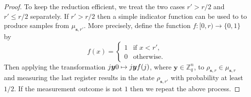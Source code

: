 \documentclass[11pt]{article}
\theoremstyle{plain}
\theoremstyle{definition}
\let\ket\relax
\DeclarePairedDelimiter{\ket}{\lvert}{\rangle}
\def\Z{\mathbb{Z}}
\begin{document}
\begin{proof}
    To keep the reduction efficient, we treat the two cases $r' > r / 2$ and $r' \le r / 2$ separately. If $r' > r / 2$ then a simple indicator function can be used to to produce samples from $\mu_{\bm{s}, r'}$. More precisely, define the function $f: [0, r) \rightarrow \{ 0, 1 \}$ by
    \[ f(x) = 
    \begin{cases}
        1 & \text{if } x < r', \\
        0 & \text{otherwise}.
    \end{cases} \]
    Then applying the transformation $\ket{j}\ket{\bm{y}}\ket{0} \mapsto \ket{j}\ket{\bm{y}}\ket{f(j)}$, where $\bm{y} \in \Z_q^n$, to $\rho_{\bm{s}, r} \in \mu_{\bm{s}, r}$ and measuring the last register results in the state $\rho_{\bm{s}, r'}$ with probability at least $1 / 2$. If the measurement outcome is not $1$ then we repeat the above process.


\end{proof}
\end{document}
